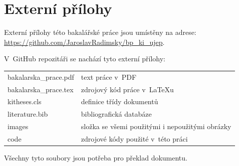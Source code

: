 \documentclass[male,czech,api_bc]{kitheses}
\begin{document}
\sloppy
\printbibliography[title=Seznam použitých zdrojů]

\appendix
\chapter{Externí přílohy\label{sec:ep}}

Externí přílohy této bakalářské práce jsou umístěny na adrese:\\ \url{https://github.com/JaroslavRadimsky/bp_ki_ujep}.

V~GitHub repozitáři se nachází tyto externí přílohy:

\begin{longtable}{ll}
	\hline
	bakalarska\_prace.pdf & text práce v~PDF \\
	bakalarska\_prace.tex & zdrojový kód práce v~\LaTeX{}u \\
	kitheses.cls & definice třídy dokumentů \\
	literature.bib & bibliografická databáze \\
	images & složka se všemi použitými i nepoužitými obrázky \\
	code & zdrojové kódy použité v~této práci \\
	\hline
\end{longtable}

Všechny tyto soubory jsou potřeba pro překlad dokumentu.
\end{document}
